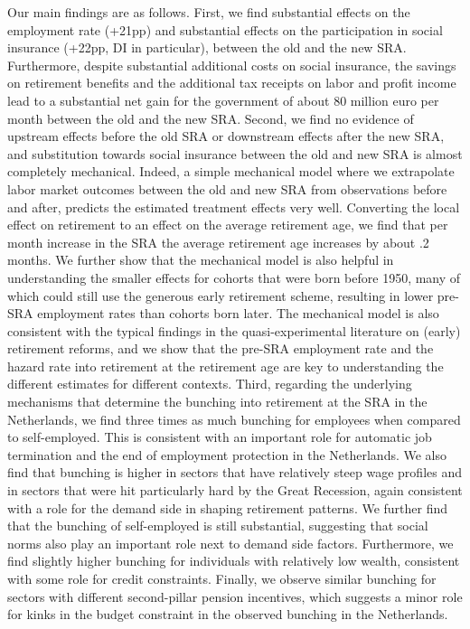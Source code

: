 \documentclass[12pt,a4paper]{article}
\begin{document}
Our main findings are as follows. First, we find substantial effects on the employment rate (+21pp) and substantial effects on the participation in social insurance (+22pp, DI in particular), between the old and the new SRA. Furthermore, despite substantial additional costs on social insurance, the savings on retirement benefits and the additional tax receipts on labor and profit income lead to a substantial net gain for the government of about 80 million euro per month between the old and the new SRA. Second, we find no evidence of upstream effects before the old SRA or downstream effects after the new SRA, and substitution towards social insurance between the old and new SRA is almost completely mechanical. Indeed, a simple mechanical model where we extrapolate labor market outcomes between the old and new SRA from observations before and after, predicts the estimated treatment effects very well. Converting the local effect on retirement to an effect on the average retirement age, we find that per month increase in the SRA the average retirement age increases by about .2 months. We further show that the mechanical model is also helpful in understanding the smaller effects for cohorts that were born before 1950, many of which could still use the generous early retirement scheme, resulting in lower pre-SRA employment rates than cohorts born later. The mechanical model is also consistent with the typical findings in the quasi-experimental literature on (early) retirement reforms, and we show that the pre-SRA employment rate and the hazard rate into retirement at the retirement age are key to understanding the different estimates for different contexts.  
Third, regarding the underlying mechanisms that determine the bunching into retirement at the SRA in the Netherlands, we find three times as much bunching for employees when compared to self-employed. This is consistent with an important role for automatic job termination and the end of employment protection in the Netherlands. We also find that bunching is higher in sectors that have relatively steep wage profiles and in sectors that were hit particularly hard by the Great Recession, again consistent with a role for the demand side in shaping retirement patterns. We further find that the bunching of self-employed is still substantial, suggesting that social norms also play an important role next to demand side factors. Furthermore, we find slightly higher bunching for individuals with relatively low wealth, consistent with some role for credit constraints. Finally, we observe similar bunching for sectors with different second-pillar pension incentives, which suggests a minor role for kinks in the budget constraint in the observed bunching in the Netherlands.
\end{document}
